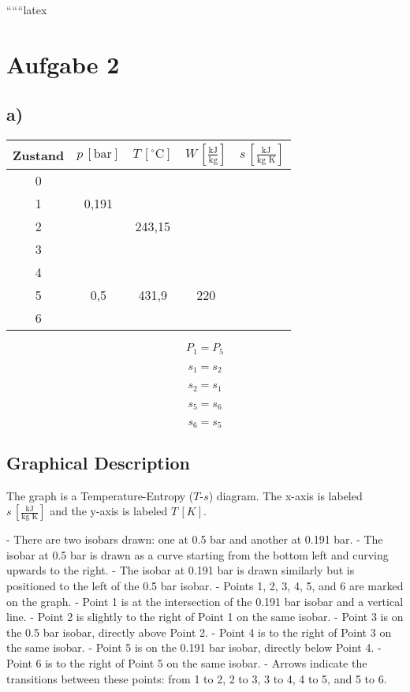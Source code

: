 
``````latex


\section*{Aufgabe 2}

\subsection*{a)}

\begin{tabular}{c|c|c|c|c}
Zustand & $p \, [\text{bar}]$ & $T \, [^\circ \text{C}]$ & $W \, [\frac{\text{kJ}}{\text{kg}}]$ & $s \, [\frac{\text{kJ}}{\text{kg K}}]$ \\
\hline
0 & & & & \\
1 & 0,191 & & & \\
2 & & 243,15 & & \\
3 & & & & \\
4 & & & & \\
5 & 0,5 & 431,9 & 220 & \\
6 & & & & \\
\end{tabular}

\[
P_1 = P_5
\]

\[
s_1 = s_2
\]

\[
s_2 = s_1
\]

\[
s_5 = s_6
\]

\[
s_6 = s_5
\]

\subsection*{Graphical Description}

The graph is a Temperature-Entropy ($T$-$s$) diagram. The x-axis is labeled $s \, [\frac{\text{kJ}}{\text{kg K}}]$ and the y-axis is labeled $T \, [K]$. 

- There are two isobars drawn: one at 0.5 bar and another at 0.191 bar.
- The isobar at 0.5 bar is drawn as a curve starting from the bottom left and curving upwards to the right.
- The isobar at 0.191 bar is drawn similarly but is positioned to the left of the 0.5 bar isobar.
- Points 1, 2, 3, 4, 5, and 6 are marked on the graph.
- Point 1 is at the intersection of the 0.191 bar isobar and a vertical line.
- Point 2 is slightly to the right of Point 1 on the same isobar.
- Point 3 is on the 0.5 bar isobar, directly above Point 2.
- Point 4 is to the right of Point 3 on the same isobar.
- Point 5 is on the 0.191 bar isobar, directly below Point 4.
- Point 6 is to the right of Point 5 on the same isobar.
- Arrows indicate the transitions between these points: from 1 to 2, 2 to 3, 3 to 4, 4 to 5, and 5 to 6.

